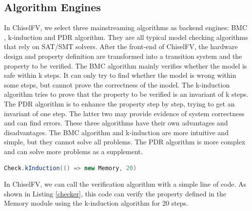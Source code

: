 \documentclass[conference]{IEEEtran}
\theoremstyle{definition}
\begin{document}
\subsection{Algorithm Engines}
In ChiselFV, we select three mainstreaming algorithms as backend engines: BMC \cite{biere1999symbolic}, k-induction \cite{sheeran2000checking} and PDR \cite{bradley2011sat} algorithm. 
They are all typical model checking algorithms that rely on SAT/SMT solvers. After the front-end of ChiselFV, the hardware design and property definition are transformed into a transition system and the property to be verified. The BMC algorithm mainly verifies whether the model is safe within k steps. It can only try to find whether the model is wrong within some steps, but cannot prove the correctness of the model. The k-induction algorithm tries to prove that the property to be verified is an invariant of k steps. The PDR algorithm is to enhance the property step by step, trying to get an invariant of one step. The latter two may provide evidence of system correctness and can find errors. These three algorithms have their own advantages and disadvantages. The BMC algorithm and k-induction are more intuitive and simple, but they cannot solve all problems. The PDR algorithm is more complex and can solve more problems as a supplement.

\begin{lstlisting}[language=scala, caption={A Code Clip to Call Formal Verification}, label=checker]
Check.kInduction(() => new Memory, 20)
\end{lstlisting}

In ChiselFV, we can call the verification algorithm with a simple line of code. As shown in Listing \ref{checker}, this code can verify the property defined in the Memory module using the k-induction algorithm for 20 steps.
\end{document}

